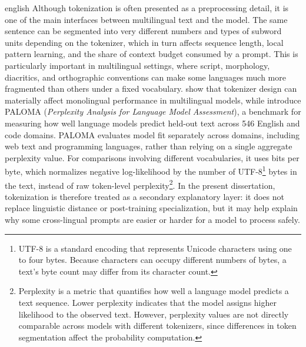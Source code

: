 \begin{otherlanguage*}{english}
Although tokenization is often presented as a preprocessing detail, it is one of the main interfaces between multilingual text and the model. The same sentence can be segmented into very different numbers and types of subword units depending on the tokenizer, which in turn affects sequence length, local pattern learning, and the share of context budget consumed by a prompt. This is particularly important in multilingual settings, where script, morphology, diacritics, and orthographic conventions can make some languages much more fragmented than others under a fixed vocabulary. \textcite{rust2021tokenizer} show that tokenizer design can materially affect monolingual performance in multilingual models, while \textcite{magnusson2023paloma} introduce PALOMA (\emph{Perplexity Analysis for Language Model Assessment}), a benchmark for measuring how well language models predict held-out text across 546 English and code domains. PALOMA evaluates model fit separately across domains, including web text and programming languages, rather than relying on a single aggregate perplexity value. For comparisons involving different vocabularies, it uses bits per byte, which normalizes negative log-likelihood by the number of UTF-8\footnote{UTF-8 is a standard encoding that represents Unicode characters using one to four bytes. Because characters can occupy different numbers of bytes, a text's byte count may differ from its character count.} bytes in the text, instead of raw token-level perplexity\footnote{Perplexity is a metric that quantifies how well a language model predicts a text sequence. Lower perplexity indicates that the model assigns higher likelihood to the observed text. However, perplexity values are not directly comparable across models with different tokenizers, since differences in token segmentation affect the probability computation.}. In the present dissertation, tokenization is therefore treated as a secondary explanatory layer: it does not replace linguistic distance or post-training specialization, but it may help explain why some cross-lingual prompts are easier or harder for a model to process safely.



\end{otherlanguage*}
